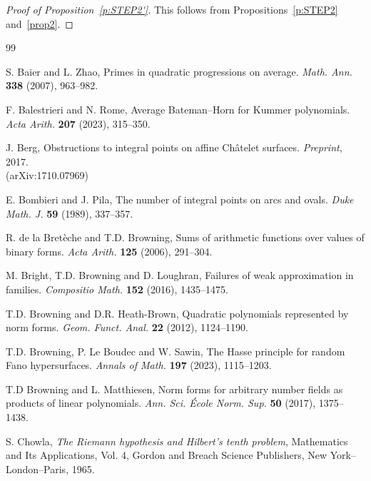 \documentclass[11pt,letterpaper]{amsart}
\theoremstyle{definition}
\numberwithin{equation}{section}
\newcommand{\0}{\mathbf{0}}
\begin{document}
\begin{proof}[Proof of Proposition~\ref{p:STEP2'}]
This follows from
Propositions~\ref{p:STEP2} and~\ref{prop2}.
\end{proof}










\begin{thebibliography}{99}


S. Baier and L. Zhao, Primes in quadratic progressions on average. {\em Math. Ann.} {\bf 338} (2007), 963--982. 

F. Balestrieri and
N. Rome,
Average Bateman--Horn for Kummer polynomials. 
{\em Acta Arith.} {\bf 207} (2023), 315--350.


J. Berg, 
Obstructions to integral points on affine Ch\^atelet surfaces. {\em Preprint}, 2017.\\
(arXiv:1710.07969)

E. Bombieri and J. Pila, The number of integral points on 
arcs and ovals. {\em Duke Math. J.} {\bf 59} (1989), 337--357.


R. de la Bret\`eche and T.D. Browning, 
 Sums of arithmetic functions over values of binary forms.
{\em Acta Arith.} {\bf 125} (2006), 291--304.

M. Bright, T.D. Browning and D. Loughran,
 Failures of weak approximation in families.
{\em Compositio Math.} {\bf 152} (2016), 1435--1475.






  T.D. Browning and D.R. Heath-Brown,
{Quadratic polynomials represented by norm forms.} {\em Geom. Funct. Anal.} {\bf 22} (2012), 1124--1190.

T.D. Browning, P. Le Boudec and W. Sawin, 
The Hasse principle for random Fano hypersurfaces. {\em Annals of Math.}
{\bf 197} (2023), 1115--1203.


 T.D Browning and L. Matthiesen,
Norm forms for arbitrary number fields as products of linear polynomials.
{\em Ann. Sci. \'Ecole Norm. Sup.} {\bf 50} (2017), 1375--1438. 


S. Chowla, {\em The {R}iemann hypothesis and {H}ilbert's tenth problem},
Mathematics and Its Applications, Vol. 4, Gordon and Breach Science Publishers, New York--London--Paris,
1965.


\end{thebibliography}
\end{document}
